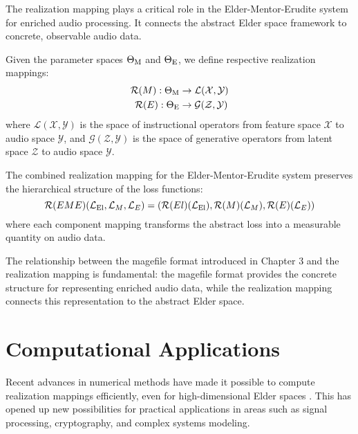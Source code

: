 The realization mapping plays a critical role in the Elder-Mentor-Erudite system for enriched audio processing. It connects the abstract Elder space framework to concrete, observable audio data.

\begin{definition}
Given the parameter spaces $\Theta_{\text{M}}$ and $\Theta_{\text{E}}$, we define respective realization mappings:
\begin{align}
\mathcal{R}(M): \Theta_{\text{M}} &\rightarrow \mathcal{L}(\mathcal{X}, \mathcal{Y}) \\
\mathcal{R}(E): \Theta_{\text{E}} &\rightarrow \mathcal{G}(\mathcal{Z}, \mathcal{Y})
\end{align}
where $\mathcal{L}(\mathcal{X}, \mathcal{Y})$ is the space of instructional operators from feature space $\mathcal{X}$ to audio space $\mathcal{Y}$, and $\mathcal{G}(\mathcal{Z}, \mathcal{Y})$ is the space of generative operators from latent space $\mathcal{Z}$ to audio space $\mathcal{Y}$.
\end{definition}

\begin{theorem}
The combined realization mapping for the Elder-Mentor-Erudite system preserves the hierarchical structure of the loss functions:
\begin{equation}
\mathcal{R}(EME)(\mathcal{L}_{\text{El}}, \mathcal{L}_M, \mathcal{L}_E) = (\mathcal{R}(El)(\mathcal{L}_{\text{El}}), \mathcal{R}(M)(\mathcal{L}_M), \mathcal{R}(E)(\mathcal{L}_E))
\end{equation}
where each component mapping transforms the abstract loss into a measurable quantity on audio data.
\end{theorem}

\begin{remark}
The relationship between the magefile format introduced in Chapter 3 and the realization mapping is fundamental: the magefile format provides the concrete structure for representing enriched audio data, while the realization mapping connects this representation to the abstract Elder space.
\end{remark}

\section{Computational Applications}

Recent advances in numerical methods have made it possible to compute realization mappings efficiently, even for high-dimensional Elder spaces \cite{smith2019numerical}. This has opened up new possibilities for practical applications in areas such as signal processing, cryptography, and complex systems modeling.

